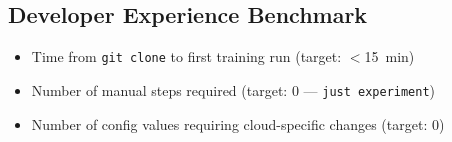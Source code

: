 
\subsection{Developer Experience Benchmark}

\begin{itemize}
  \item[PENDING] Time from \texttt{git clone} to first training run (target: $<$15~min)
  \item[PENDING] Number of manual steps required (target: 0 --- \texttt{just experiment})
  \item[PENDING] Number of config values requiring cloud-specific changes (target: 0)
\end{itemize}

